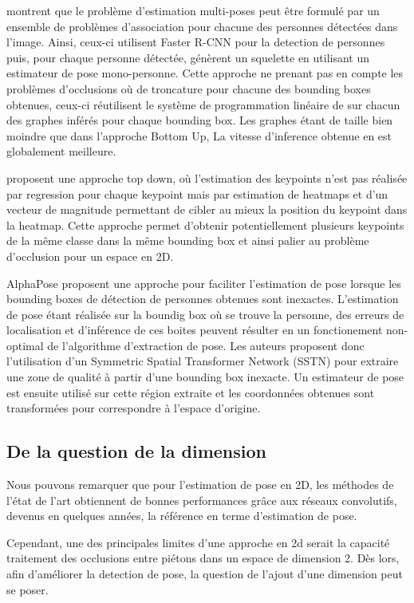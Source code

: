 \cite{2016arXiv160808526I} montrent que le problème d'estimation multi-poses peut être formulé par un ensemble de problèmes d'association pour chacune des personnes détectées dans l'image. Ainsi, ceux-ci utilisent Faster R-CNN pour la detection de personnes puis, pour chaque personne détectée, génèrent un squelette en utilisant un estimateur de pose mono-personne. Cette approche ne prenant pas en compte les problèmes d'occlusions où de troncature pour chacune des bounding boxes obtenues, ceux-ci réutilisent le système de programmation linéaire de \cite{2015arXiv151106645P} sur chacun des graphes inférés pour chaque bounding box. Les graphes étant de taille bien moindre que dans l'approche Bottom Up, La vitesse d'inference obtenue en est globalement meilleure.

\cite{2017arXiv170101779P} proposent une approche top down, où l'estimation des keypoints n'est pas réalisée par regression pour chaque keypoint mais par estimation de heatmaps et d'un vecteur de magnitude permettant de cibler au mieux la position du keypoint dans la heatmap. Cette approche permet d'obtenir potentiellement plusieurs keypoints de la même classe dans la même bounding box et ainsi palier au problème d'occlusion pour un espace en 2D. 

AlphaPose \cite{fang2017rmpe} proposent une approche pour faciliter l'estimation de pose lorsque les bounding boxes de détection de personnes obtenues sont inexactes. L'estimation de pose étant réalisée sur la boundig box où se trouve la personne, des erreurs de localisation et d'inférence de ces boites peuvent résulter en un fonctionement non-optimal de l'algorithme d'extraction de pose. Les auteurs proposent donc l'utilisation d'un Symmetric Spatial Transformer Network (SSTN) pour extraire une zone de qualité à partir d'une bounding box inexacte. Un estimateur de pose est ensuite utilisé sur cette région extraite et les coordonnées obtenues sont transformées pour correspondre à l'espace d'origine.


\subsection{De la question de la dimension}
Nous pouvons remarquer que pour l'estimation de pose en 2D, les méthodes de l'état de l'art obtiennent de bonnes performances grâce aux réseaux convolutifs, devenus en quelques années, la référence en terme d'estimation de pose.

Cependant, une des principales limites d'une approche en 2d serait la capacité traitement des occlusions entre piétons dans un espace de dimension 2. Dès lors, afin d'améliorer la detection de pose, la question de l'ajout d'une dimension peut se poser.

